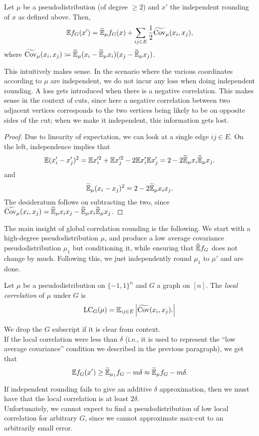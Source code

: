 	\begin{fprop}
		Let $\mu$ be a pseudodistribution (of degree $\ge 2$) and $x'$ the independent rounding of $x$ as defined above. Then,
		\[ \mathbb{E} f_G(x') = \widetilde{\mathbb{E}}_\mu f_G(x) + \sum_{ij \in E} \frac{1}{2} \widetilde{\operatorname{Cov}}_\mu(x_i,x_j), \]
		where $\widetilde{\operatorname{Cov}}_\mu (x_i,x_j) \coloneqq \widetilde{\mathbb{E}}_\mu (x_i - \widetilde{\mathbb{E}}_\mu x_i)(x_j - \widetilde{\mathbb{E}}_\mu x_j)$.
	\end{fprop}
	This intuitively makes sense. In the scenario where the various coordinates according to $\mu$ are independent, we do not incur any loss when doing independent rounding. A loss gets introduced when there is a negative correlation. This makes sense in the context of cuts, since here a negative correlation between two adjacent vertices corresponds to the two vertices being likely to be on opposite sides of the cut; when we make it independent, this information gets lost.
	\begin{proof}
		Due to linearity of expectation, we can look at a single edge $ij \in E$. On the left, independence implies that
		\[ \mathbb{E} (x_i' - x_j')^2 = \mathbb{E} x_i'^2 + \mathbb{E} x_j'^2 - 2 \mathbb{E} x_i' \mathbb{E} x_j' = 2 - 2 \widetilde{\mathbb{E}}_\mu x_i \widetilde{\mathbb{E}}_\mu x_j. \]
		and
		\[ \widetilde{\mathbb{E}}_\mu (x_i - x_j)^2 = 2 - 2\widetilde{\mathbb{E}}_\mu x_i x_j. \]
		The desideratum follows on subtracting the two, since $\widetilde{\operatorname{Cov}}_\mu(x_i,x_j) = \widetilde{\mathbb{E}}_\mu x_i x_j - \widetilde{\mathbb{E}}_\mu x_i \widetilde{\mathbb{E}}_\mu x_j$.
	\end{proof}

	The main insight of global correlation rounding is the following. We start with a high-degree pseudodistribution $\mu$, and produce a low average covariance pseudodistribution $\mu_1$ but conditioning it, while ensuring that $\widetilde{\mathbb{E}} f_G$ does not change by much. Following this, we just independently round $\mu_1$ to $\mu'$ and are done.\\

	\begin{fdef}
		Let $\mu$ be a pseudodistribution on $\{-1,1\}^n$ and $G$ a graph on $[n]$. The \emph{local correlation} of $\mu$ under $G$ is
		\[ \operatorname{LC}_G(\mu) = \mathbb{E}_{ij \in E} \left|\widetilde{\operatorname{Cov}}(x_i,x_j).\right| \]
	\end{fdef}
	We drop the $G$ subscript if it is clear from context.\\
	If the local correlation were less than $\delta$ (i.e., it is used to represent the ``low average covariance'' condition we described in the previous paragraph), we get that
	\[ \mathbb{E} f_G(x') \ge \widetilde{\mathbb{E}}_{\mu_1} f_G - m\delta \approx \widetilde{\mathbb{E}}_\mu f_G - m\delta. \]

	If independent rounding fails to give an additive $\delta$ approximation, then we must have that the local correlation is at least $2\delta$.\\
	Unfortunately, we cannot expect to find a pseudodistribution of low local correlation for arbitrary $G$, since we cannot approximate max-cut to an arbitrarily small error.\\ %

